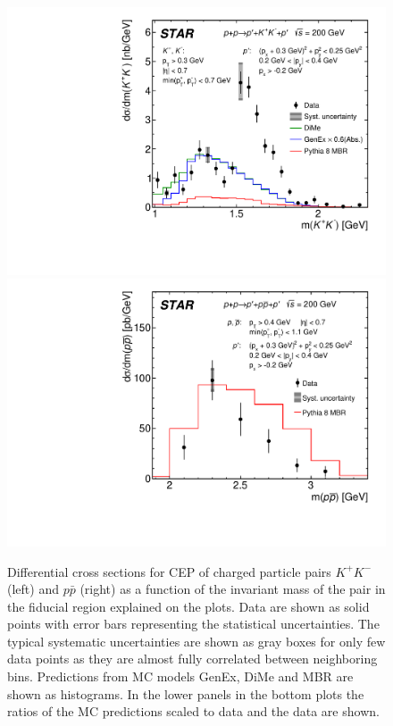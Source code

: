 \begin{figure}[h]
\centering
\includegraphics[width=.48\textwidth,page=1]{graphics/physicsResults/FinalResult_InvMass_kaon.pdf}
\includegraphics[width=.48\textwidth,page=1]{graphics/physicsResults/FinalResult_InvMass_proton.pdf}
%
\caption{Differential cross sections for CEP of charged particle pairs $K^+K^-$ (left) and $p\bar{p}$ (right) as a function of the invariant mass of the pair in the fiducial region explained on the plots. Data are shown as solid points with error bars representing the statistical uncertainties. The typical systematic uncertainties are shown as gray boxes for only few data points as they are almost fully correlated between neighboring bins. Predictions from MC models GenEx, DiMe and MBR are shown as histograms. In the lower panels in the bottom plots the ratios of the MC predictions scaled to data and the data are shown.}
\label{results_02}
\end{figure}
% 
